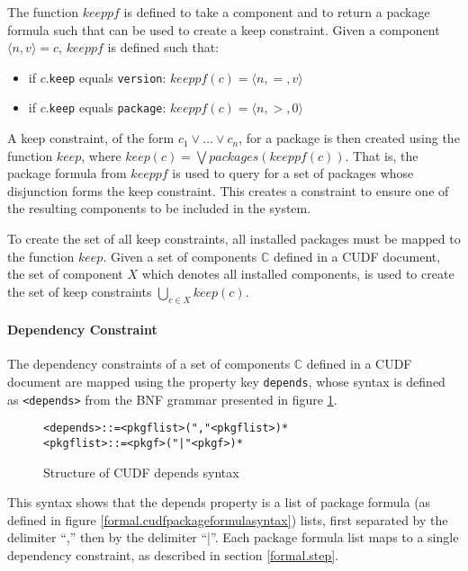 The function $keeppf$ is defined to take a component and to return a package formula such that can be used to create a keep constraint.
Given a component $\langle n,v \rangle = c$, $keeppf$ is defined such that:
\begin{itemize}
	\item if $c$.\verb+keep+ equals \verb+version+: $keeppf(c) = \langle n, =, v \rangle$
	\item if $c$.\verb+keep+ equals \verb+package+: $keeppf(c) = \langle n, >, 0 \rangle$
\end{itemize}

A keep constraint, of the form $c_1 \vee \ldots \vee c_n$, for a package is then created using the function $keep$,
where $keep(c) = \bigvee packages(keeppf(c))$.
That is, the package formula from $keeppf$ is used to query for a set of packages whose disjunction forms the keep constraint.
This creates a constraint to ensure one of the resulting components to be included in the system.

To create the set of all keep constraints, all installed packages must be mapped to the function $keep$.
Given a set of components $\mathbb{C}$ defined in a CUDF document, 
the set of component $X$ which denotes all installed components, is used to create the set of keep constraints $\bigcup \limits_{c \in X} keep(c)$.

\paragraph{Dependency Constraint}
The dependency constraints of a set of components $\mathbb{C}$ defined in a CUDF document are mapped using the property key \verb+depends+,
whose syntax is defined as \verb+<depends>+ from the BNF grammar presented in figure \ref{formal.cudfdependssyntax}.

\begin{figure}[htp] 
\begin{center}
\begin{alltt}
<depends> ::= <pkgflist> ("," <pkgflist>)*
<pkgflist> ::= <pkgf> ("|" <pkgf>)*
\end{alltt}
  \caption[CUDF Package depends syntax]{Structure of CUDF depends syntax}
  \label{formal.cudfdependssyntax}
\end{center}
\end{figure}

This syntax shows that the depends property is a list of package formula (as defined in figure \ref{formal.cudfpackageformulasyntax}) lists, 
first separated by the delimiter ``,'' then by the delimiter ``|''.
Each package formula list maps to a single dependency constraint, as described in section \ref{formal.step}.

